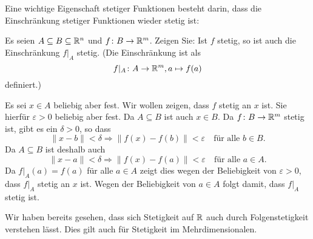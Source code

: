 \documentclass[a4paper,10pt]{article}
\begin{document}
Eine wichtige Eigenschaft stetiger Funktionen besteht darin, dass die Einschränkung stetiger Funktionen wieder stetig ist:


\begin{question}
 Es seien $A \subseteq B \subseteq \mathbb{R}^n$ und $f \colon B \to \mathbb{R}^m$. Zeigen Sie: Ist $f$ stetig, so ist auch die Einschränkung $f|_A$ stetig. (Die Einschränkung ist als
 \[
  f|_A \colon A \to \mathbb{R}^m, a \mapsto f(a)
 \]
 definiert.)
\end{question}
\begin{solution}
 Es sei $x \in A$ beliebig aber fest. Wir wollen zeigen, dass $f$ stetig an $x$ ist. Sie hierfür $\varepsilon > 0$ beliebig aber fest. Da $A \subseteq B$ ist auch $x \in B$. Da $f \colon B \to \mathbb{R}^m$ stetig ist, gibt es ein $\delta > 0$, so dass
 \[
  \|x-b\| < \delta \Rightarrow \|f(x)-f(b)\| < \varepsilon
  \quad \text{für alle $b \in B$}.
 \]
 Da $A \subseteq B$ ist deshalb auch
 \[
  \|x-a\| < \delta \Rightarrow \|f(x)-f(a)\| < \varepsilon
  \quad \text{für alle $a \in A$}.
 \]
 Da $f|_A(a) = f(a)$ für alle $a \in A$ zeigt dies wegen der Beliebigkeit von $\varepsilon > 0$, dass $f|_A$ stetig an $x$ ist. Wegen der Beliebigkeit von $a \in A$ folgt damit, dass $f|_A$ stetig ist.
\end{solution}


Wir haben bereits gesehen, dass sich Stetigkeit auf $\mathbb{R}$ auch durch Folgenstetigkeit verstehen lässt. Dies gilt auch für Stetigkeit im Mehrdimensionalen.
\end{document}
